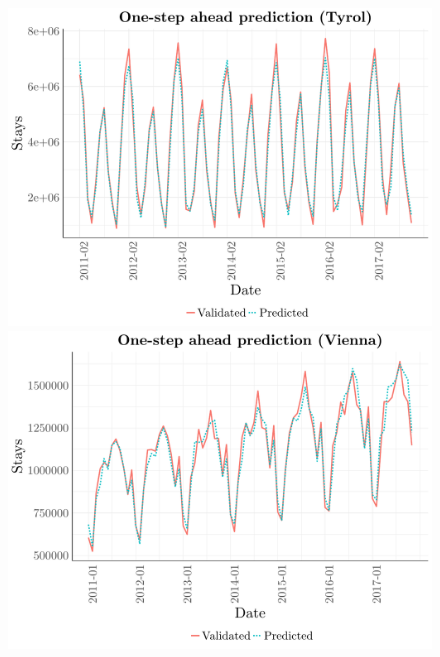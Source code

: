 \documentclass[a4paper,reqno,]{article}
\begin{document}
\begin{figure}[h!]
\begin{minipage}[h!]{0.33\textwidth}
    \includegraphics[width=1\textwidth]{images/RFR/Tyrol_one_step_ahead.pdf}
\end{minipage}
\begin{minipage}[h!]{0.33\textwidth}
\centering
    \includegraphics[width=1\textwidth]{images/RFR/Vienna_one_step_ahead.pdf}
\end{minipage}
\begin{minipage}[h!]{0.33\textwidth}
\centering

\end{minipage}
\end{figure}
\end{document}
